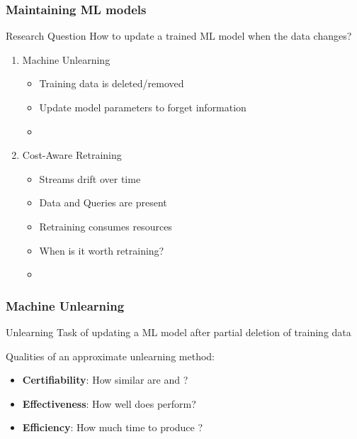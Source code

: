 \documentclass[pdf]{beamer}
\begin{document}
\begin{frame}
    \frametitle{Maintaining ML models}

    \begin{block}{\centering Research Question}
        \centering
        How to update a trained ML model when the data changes?
    \end{block}

    \begin{enumerate}
        \item Machine Unlearning 
        \begin{itemize}
            \item Training data is deleted/removed
            \item Update model parameters to forget information
            \item \citet{mahadevan2022certifiable}
        \end{itemize}
        \item Cost-Aware Retraining
        \begin{itemize}
            \item Streams drift over time
            \item Data and Queries are present
            \item Retraining consumes resources
            \item When is it worth retraining?
            \item \citet{mahadevan2023costeffective}
        \end{itemize}
    \end{enumerate}
\end{frame}


\begin{frame}
    \frametitle{Machine Unlearning }
    \scalebox{0.5}{
    \begin{tikzpicture}
        
      \end{tikzpicture}
    }

    \begin{block}{Unlearning}
        Task of updating a ML model after partial deletion of training data
    \end{block}
    Qualities of an approximate unlearning method:
  \begin{itemize}
    \item \textbf{Certifiability}: How similar are \wunlearned and \worig?
    \item \textbf{Effectiveness}: How well does \wunlearned perform?
    \item \textbf{Efficiency}: How much time to produce \wunlearned?
  \end{itemize}

\end{frame}
\end{document}
